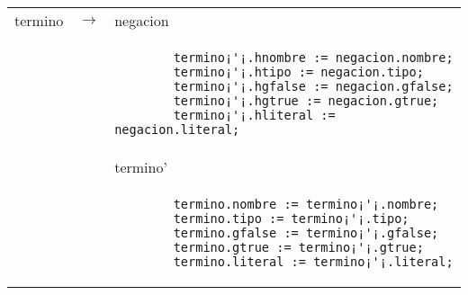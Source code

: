 \begin{tabular}{r c p{}}
		
			termino			& $\longrightarrow$ 	& negacion \\
							&					& \begin{lstlisting}
		termino¡'¡.hnombre := negacion.nombre;
        termino¡'¡.htipo := negacion.tipo;
        termino¡'¡.hgfalse := negacion.gfalse;
        termino¡'¡.hgtrue := negacion.gtrue;
        termino¡'¡.hliteral := negacion.literal;
                    									\end{lstlisting} \\
								&					& termino' \\
								&					& \begin{lstlisting}
		termino.nombre := termino¡'¡.nombre;
        termino.tipo := termino¡'¡.tipo;
        termino.gfalse := termino¡'¡.gfalse;
        termino.gtrue := termino¡'¡.gtrue;
        termino.literal := termino¡'¡.literal;
                    									\end{lstlisting} \\
\end{tabular}

